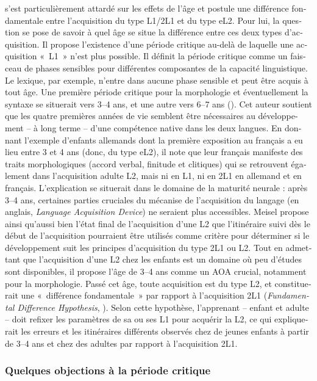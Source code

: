 \documentclass[french, output=paper]{langscibook}
\begin{document}
\begin{otherlanguage}{french}
\citet{Meisel2009} s’est particulièrement attardé sur les effets de l’âge et postule une différence fondamentale entre l’acquisition du type L1/2L1 et du type eL2. Pour lui, la question se pose de savoir à quel âge se situe la différence entre ces deux types d’acquisition. Il propose l’existence d’une période critique au-delà de laquelle une acquisition «~L1~» n’est plus possible. Il définit la période critique comme un faisceau de phases sensibles pour différentes composantes de la capacité linguistique. Le lexique, par exemple, n’entre dans aucune phase sensible et peut être acquis à tout âge. Une première période critique pour la morphologie et éventuellement la syntaxe se situerait vers 3--4 ans, et une autre vers 6--7 ans (\citealt[268]{Meisel2009}). Cet auteur soutient que les quatre premières années de vie semblent être nécessaires au développement – à long terme – d’une compétence native dans les deux langues. En donnant l’exemple d’enfants allemands dont la première exposition au français a eu lieu entre 3 et 4 ans (donc, du type eL2), il note que leur français manifeste des traits morphologiques (accord verbal, finitude et clitiques) qui se retrouvent également dans l’acquisition adulte L2, mais ni en L1, ni en 2L1 en allemand et en français. L’explication se situerait dans le domaine de la maturité neurale : après 3--4 ans, certaines parties cruciales du mécanise de l’acquisition du langage (en anglais, \textit{Language Acquisition Device}) ne seraient plus accessibles. Meisel propose ainsi qu’aussi bien l’état final de l’acquisition d’une L2 que l’itinéraire suivi dès le début de l’acquisition pourraient être utilisés comme critère pour déterminer si le développement suit les principes d’acquisition du type 2L1 ou L2. Tout en admettant que l’acquisition d’une L2 chez les enfants est un domaine où peu d’études sont disponibles, il propose l’âge de 3--4 ans comme un AOA crucial, notamment pour la morphologie. Passé cet âge, toute acquisition est du type L2, et constituerait une «~différence fondamentale~» par rapport à l’acquisition 2L1 (\textit{Fundamental Difference Hypothesis}, \citealt{Bley-Vroman1990}). Selon cette hypothèse, l’apprenant -- enfant et adulte -- doit refixer les paramètres de sa ou ses L1 pour acquérir la L2, ce qui expliquerait les erreurs et les itinéraires différents observés chez de jeunes enfants à partir de 3--4 ans et chez des adultes par rapport à l’acquisition 2L1.


\subsubsection{Quelques objections à la période critique}\label{sec:kihlstedt:2.1.2}


\end{otherlanguage}
\end{document}
